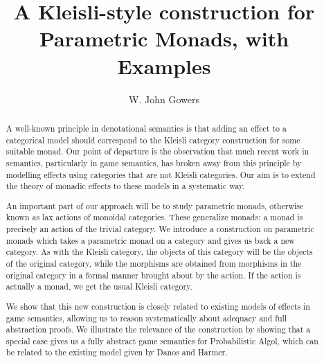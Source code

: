 \documentclass{svproc}
\newcommand{\0}{{\mathtt{0}}} \newcommand{\com}{{\mathtt{com}}}
\begin{document}
\mainmatter              %
%
\title{A Kleisli-style construction for Parametric Monads, with Examples}
%
%
\author{W. John Gowers}
%
%
\tocauthor{}
%

\maketitle              %

\begin{abstract}
  A well-known principle in denotational semantics is that adding an effect to a categorical model should correspond to the Kleisli category construction for some suitable monad.  
  Our point of departure is the observation that much recent work in semantics, particularly in game semantics, has broken away from this principle by modelling effects using categories that are not Kleisli categories.  
  Our aim is to extend the theory of monadic effects to these models in a systematic way.

  An important part of our approach will be to study parametric monads, otherwise known as lax actions of monoidal categories.
  These generalize monads: a monad is precisely an action of the trivial category.
  We introduce a construction on parametric monads which takes a parametric monad on a category and gives us back a new category.  
  As with the Kleisli category, the objects of this category will be the objects of the original category, while the morphisms are obtained from morphisms in the original category in a formal manner brought about by the action.  
  If the action is actually a monad, we get the usual Kleisli category.

  We show that this new construction is closely related to existing models of effects in game semantics, allowing us to reason systematically about adequacy and full abstraction proofs.
  We illustrate the relevance of the construction by showing that a special case gives us a fully abstract game semantics for Probabilistic Algol, which can be related to the existing model given by Danos and Harmer.
\end{abstract}
\end{document}
